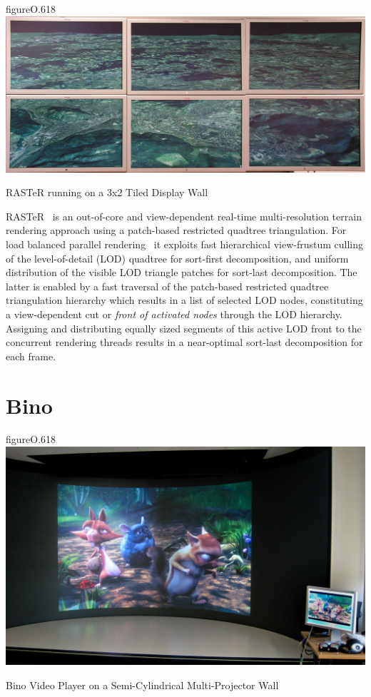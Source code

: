 \begin{wrapfloat}{figure}{O}{.618\textwidth}
  \includegraphics[width=.618\textwidth]{images/raster}
  {\caption{\label{fRaster}RASTeR running on a 3x2 Tiled Display Wall}}
\end{wrapfloat}

RASTeR~\cite{BGP:09} is an out-of-core and view-dependent real-time
multi-resolution terrain rendering approach using a patch-based restricted
quadtree triangulation. For load balanced parallel rendering~\cite{GMBP:10} it
exploits fast hierarchical view-frustum culling of the level-of-detail (LOD)
quadtree for sort-first decomposition, and uniform distribution of the visible
LOD triangle patches for sort-last decomposition. The latter is enabled by a
fast traversal of the patch-based restricted quadtree triangulation hierarchy
which results in a list of selected LOD nodes, constituting a view-dependent cut
or \emph{front of activated nodes} through the LOD hierarchy. Assigning and
distributing equally sized segments of this active LOD front to the concurrent
rendering threads results in a near-optimal sort-last decomposition for each
frame.

\section{Bino}

\begin{wrapfloat}{figure}{O}{.618\textwidth}
  \includegraphics[width=.618\textwidth]{images/bino}
  {\caption{\label{fBino}Bino Video Player on a Semi-Cylindrical Multi-Projector Wall}}
\end{wrapfloat}

